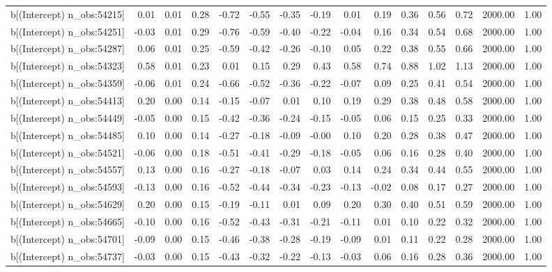 \begin{table}[ht]
\begin{tabular}{rrrrrrrrrrrrrrr}
  b[(Intercept) n\_obs:54215] & 0.01 & 0.01 & 0.28 & -0.72 & -0.55 & -0.35 & -0.19 & 0.01 & 0.19 & 0.36 & 0.56 & 0.72 & 2000.00 & 1.00 \\ 
  b[(Intercept) n\_obs:54251] & -0.03 & 0.01 & 0.29 & -0.76 & -0.59 & -0.40 & -0.22 & -0.04 & 0.16 & 0.34 & 0.54 & 0.68 & 2000.00 & 1.00 \\ 
  b[(Intercept) n\_obs:54287] & 0.06 & 0.01 & 0.25 & -0.59 & -0.42 & -0.26 & -0.10 & 0.05 & 0.22 & 0.38 & 0.55 & 0.66 & 2000.00 & 1.00 \\ 
  b[(Intercept) n\_obs:54323] & 0.58 & 0.01 & 0.23 & 0.01 & 0.15 & 0.29 & 0.43 & 0.58 & 0.74 & 0.88 & 1.02 & 1.13 & 2000.00 & 1.00 \\ 
  b[(Intercept) n\_obs:54359] & -0.06 & 0.01 & 0.24 & -0.66 & -0.52 & -0.36 & -0.22 & -0.07 & 0.09 & 0.25 & 0.41 & 0.54 & 2000.00 & 1.00 \\ 
  b[(Intercept) n\_obs:54413] & 0.20 & 0.00 & 0.14 & -0.15 & -0.07 & 0.01 & 0.10 & 0.19 & 0.29 & 0.38 & 0.48 & 0.58 & 2000.00 & 1.00 \\ 
  b[(Intercept) n\_obs:54449] & -0.05 & 0.00 & 0.15 & -0.42 & -0.36 & -0.24 & -0.15 & -0.05 & 0.06 & 0.15 & 0.25 & 0.33 & 2000.00 & 1.00 \\ 
  b[(Intercept) n\_obs:54485] & 0.10 & 0.00 & 0.14 & -0.27 & -0.18 & -0.09 & -0.00 & 0.10 & 0.20 & 0.28 & 0.38 & 0.47 & 2000.00 & 1.00 \\ 
  b[(Intercept) n\_obs:54521] & -0.06 & 0.00 & 0.18 & -0.51 & -0.41 & -0.29 & -0.18 & -0.05 & 0.06 & 0.16 & 0.28 & 0.40 & 2000.00 & 1.00 \\ 
  b[(Intercept) n\_obs:54557] & 0.13 & 0.00 & 0.16 & -0.27 & -0.18 & -0.07 & 0.03 & 0.14 & 0.24 & 0.34 & 0.44 & 0.55 & 2000.00 & 1.00 \\ 
  b[(Intercept) n\_obs:54593] & -0.13 & 0.00 & 0.16 & -0.52 & -0.44 & -0.34 & -0.23 & -0.13 & -0.02 & 0.08 & 0.17 & 0.27 & 2000.00 & 1.00 \\ 
  b[(Intercept) n\_obs:54629] & 0.20 & 0.00 & 0.15 & -0.19 & -0.11 & 0.01 & 0.09 & 0.20 & 0.30 & 0.40 & 0.51 & 0.59 & 2000.00 & 1.00 \\ 
  b[(Intercept) n\_obs:54665] & -0.10 & 0.00 & 0.16 & -0.52 & -0.43 & -0.31 & -0.21 & -0.11 & 0.01 & 0.10 & 0.22 & 0.32 & 2000.00 & 1.00 \\ 
  b[(Intercept) n\_obs:54701] & -0.09 & 0.00 & 0.15 & -0.46 & -0.38 & -0.28 & -0.19 & -0.09 & 0.01 & 0.11 & 0.22 & 0.28 & 2000.00 & 1.00 \\ 
  b[(Intercept) n\_obs:54737] & -0.03 & 0.00 & 0.15 & -0.43 & -0.32 & -0.22 & -0.13 & -0.03 & 0.06 & 0.16 & 0.28 & 0.36 & 2000.00 & 1.00 \\ 

\end{tabular}
\end{table}
